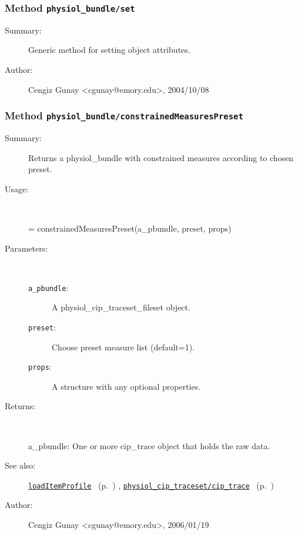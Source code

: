 \subsubsection[Method \texttt{set}]{Method \texttt{physiol\_bundle/set}}%
%
\label{ref_physiol_bundle__set}%
\hypertarget{ref_physiol_bundle__set}{}%
\begin{description}
\item[Summary:]Generic method for setting object attributes.
%
%
%
%
%
%
%
\item[Author:]%
Cengiz Gunay <cgunay@emory.edu>, 2004/10/08%
\end{description}
\methodline%
\subsubsection[Method \texttt{constrainedMeasuresPreset}]{Method \texttt{physiol\_bundle/constrainedMeasuresPreset}}%
%
\label{ref_physiol_bundle__constrainedMeasuresPreset}%
\hypertarget{ref_physiol_bundle__constrainedMeasuresPreset}{}%
\begin{description}
\item[Summary:]Returns a physiol\_bundle with constrained measures according to chosen preset.
%
\item[Usage:]~%
\begin{lyxcode}%
[a\_pbundle test\_names] = constrainedMeasuresPreset(a\_pbundle, preset, props)
%
\end{lyxcode}%
%
%
\item[Parameters:]~
\begin{description}%
\item[\texttt{a\_pbundle}:]
 A physiol\_cip\_traceset\_fileset object.
\item[\texttt{preset}:]
 Choose preset measure list (default=1).
\item[\texttt{props}:]
 A structure with any optional properties.
\end{description}%
%
\item[Returns:]~

	a\_pbundle: One or more cip\_trace object that holds the raw data.
%
%
\item[See also:]%
\hyperlink{ref_loadItemProfile}{\texttt{loadItemProfile}}%
\ (p.~\pageref{ref_loadItemProfile})%
%
, \hyperlink{ref_physiol_cip_traceset__cip_trace}{\texttt{physiol\_cip\_traceset/cip\_trace}}%
\ (p.~\pageref{ref_physiol_cip_traceset__cip_trace})%
%
%
\item[Author:]%
Cengiz Gunay <cgunay@emory.edu>, 2006/01/19%
\end{description}
\methodline%

